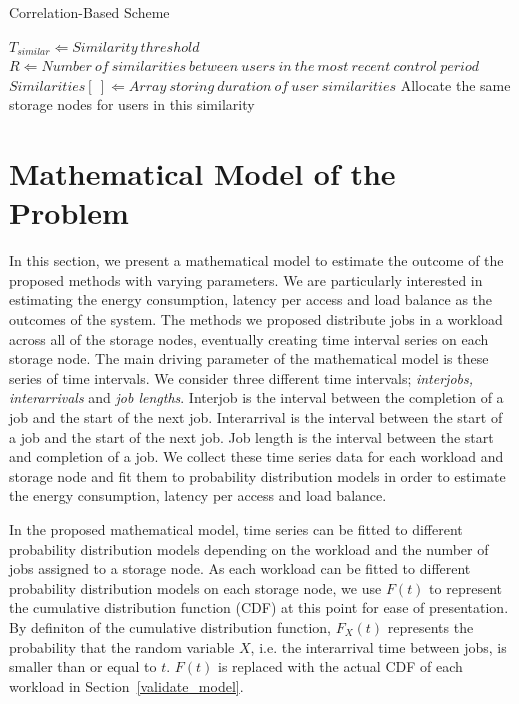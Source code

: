 \documentclass[preprint,12pt]{elsarticle}
\begin{document}
\begin{algorithm}[!htbp]
\caption{Correlation-Based Scheme}
\label{corrapp}
\begin{algorithmic}[1]
    \STATE $T_{similar} \Leftarrow Similarity\ threshold$
    \STATE $R \Leftarrow Number\ of\ similarities\ between\ users\ in\ the\ most\ recent\ control\ period$
    \STATE $Similarities[\ ] \Leftarrow Array\ storing\ duration\ of\ user\ similarities$
            \STATE Allocate the same storage nodes for users in this similarity
        \ENDIF
    \ENDFOR
\end{algorithmic}
\end{algorithm}


\section{Mathematical Model of the Problem}
\label{model}
In this section, we present a mathematical model to estimate the outcome
of the proposed methods with varying parameters. We are particularly interested
in estimating the energy consumption, latency per access and load balance as the outcomes
of the system. The methods we proposed distribute jobs in a workload across
all of the storage nodes, eventually creating time interval series on each
storage node. The main driving parameter of the mathematical model is these series of
time intervals. We consider three different time intervals;
\textit{interjobs, interarrivals} and \textit{job lengths}. Interjob is
the interval between the completion of a job and the start of the next
job. Interarrival is the interval between the start of a job and the
start of the next job. Job length is the interval between the start and
completion of a job. We collect these time series data for each workload
and storage node and fit them to probability distribution models in order
to estimate the energy consumption, latency per access and load balance.

In the proposed mathematical model, time series can be fitted to different
probability distribution models depending on the workload and the number
of jobs assigned to a storage node. As each workload can be fitted to
different probability distribution models on each storage node, we use
$F(t)$ to represent the cumulative distribution function (CDF) at this
point for ease of presentation. By definiton of the cumulative distribution function, $F_{X}(t)$ represents
the probability that the random variable $X$, i.e. the interarrival
time between jobs, is smaller than or equal to $t$.
$F(t)$ is replaced with the actual CDF
of each workload in Section~\ref{validate_model}.
\end{document}
